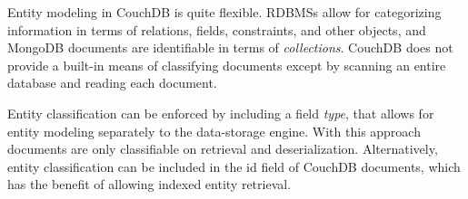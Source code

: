 Entity modeling in CouchDB is quite flexible. RDBMSs allow for categorizing information in terms of relations, fields, constraints, and other objects, and MongoDB documents are identifiable in terms of \textit{collections}. CouchDB does not provide a built-in means of classifying documents except by scanning an entire database and reading each document.

Entity classification can be enforced by including a field \textit{type}, that allows for entity modeling separately to the data-storage engine. With this approach documents are only classifiable on retrieval and deserialization. Alternatively, entity classification can be included in the id field of CouchDB documents, which has the benefit of allowing indexed entity retrieval.